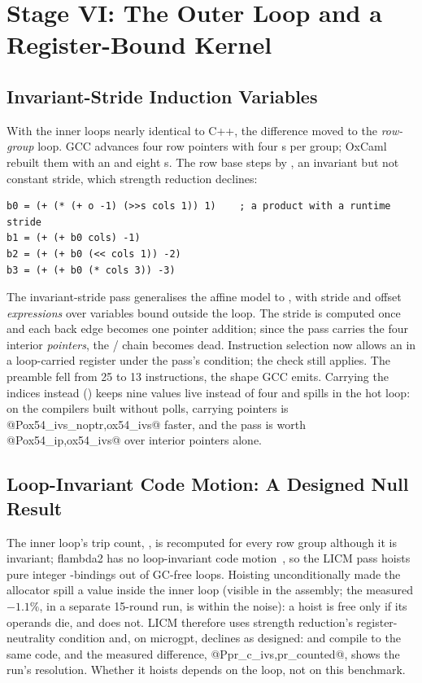 \section{Stage VI: The Outer Loop and a Register-Bound Kernel}
\label{sec:stage6}

\subsection{Invariant-Stride Induction Variables}
\label{sec:ivs}
With the inner loops nearly identical to C++, the difference moved to the
\emph{row-group} loop. GCC advances four row pointers with four s
per group; OxCaml rebuilt them with an  and eight s.
The row base  steps by , an invariant but not
constant stride, which strength reduction declines:

\begin{lstlisting}[language=CmmX,caption={The row bases in Cmm (tagged arithmetic).},label=lst:rowbases,numbers=none]
b0 = (+ (* (+ o -1) (>>s cols 1)) 1)    ; a product with a runtime stride
b1 = (+ (+ b0 cols) -1)
b2 = (+ (+ b0 (<< cols 1)) -2)
b3 = (+ (+ b0 (* cols 3)) -3)
\end{lstlisting}

The invariant-stride pass generalises the affine model to
, with stride and offset
\emph{expressions} over variables bound outside the loop. The stride is
computed once and each back edge becomes one pointer addition; since the pass
carries the four interior \emph{pointers}, the / chain
becomes dead. Instruction selection now allows an  in a
loop-carried register under the pass's condition; the 
check still applies. The preamble fell from 25 to 13 instructions, the shape
GCC emits. Carrying the indices
instead () keeps nine values live instead of
four and spills in the hot loop: on the compilers built without polls,
carrying pointers is @P{ox54_ivs_noptr,ox54_ivs}@ faster, and the pass is
worth @P{ox54_ip,ox54_ivs}@ over interior pointers alone.

\subsection{Loop-Invariant Code Motion: A Designed Null Result}
The inner loop's trip count, , is recomputed for every
row group although it is invariant; flambda2 has no loop-invariant code
motion~\cite{aho2006dragon}, so the LICM pass hoists pure integer
-bindings out of GC-free loops. Hoisting unconditionally made the
allocator spill a value inside the inner loop (visible in the assembly; the
measured $-1.1\%$, in a separate 15-round run, is within the noise): a hoist
is free only if its operands die, and  does not. LICM therefore
uses strength reduction's register-neutrality condition and, on microgpt,
declines as designed:  and  compile to the
same code, and the measured difference, @P{pr_c_ivs,pr_counted}@, shows the
run's resolution. Whether it hoists depends on the loop, not on this
benchmark.


